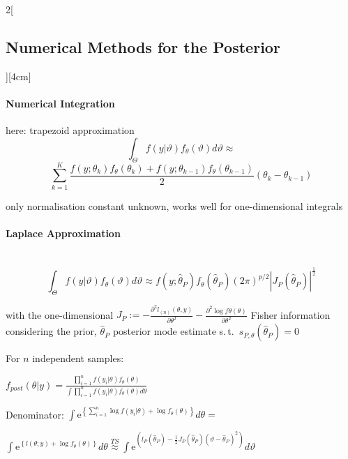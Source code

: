 \documentclass[8pt]{extarticle}
\begin{document}
\begin{multicols}{2}[\subsection{Numerical Methods for the Posterior}][4cm]

\paragraph{Numerical Integration} here: trapezoid approximation
$$\int_\Theta f(y|\vartheta)f_\theta(\vartheta)d\vartheta\approx$$ $$  \sum_{k=1}^K \frac{f(y;\theta_k)f_\theta(\theta_k) + f(y;\theta_{k-1})f_\theta(\theta_{k-1})}{2}(\theta_k {-} \theta_{k-1})$$

 \noindent only normalisation constant unknown, works well for one-dimensional integrals


\paragraph{Laplace Approximation} \ \\

$$\int_\Theta f(y|\vartheta)f_\theta(\vartheta)d\vartheta \approx f(y;\hat{\theta}_P) f_\theta(\hat{\theta}_P)(2\pi)^{p/2}\left|J_{P}(\hat{\theta}_P)\right|^{\frac{1}{2}}$$

\noindent with the one-dimensional $J_{P} := {-}\frac{\partial^2 l_{(n)}(\theta,y)}{\partial \theta^2} {-} \frac{\partial^2 \log f\theta(\theta)}{\partial\theta^2}$ Fisher information considering the prior, $\hat{\theta}_P$ posterior mode estimate s.\,t.\ $s_{P,\theta}(\hat{\theta}_P)=0$

\begin{Proof}
For $n$ independent samples:\vspace{0.2em}

$f_{post}(\theta|y)=\frac{\prod_{i=1}^n f(y_i|\theta)f_\theta(\theta)}{\int \prod_{i=1}^n f(y_i|\theta)f_\theta(\theta)d\theta}$
\vspace{0.6em}

\noindent Denominator:\vspace{0.2em}
\vspace{0.2em}
$\int \mathrm{e}^{\left\{ \sum_{i=1}^n \log f(y_i|\theta) + \log f_\theta(\theta)\right\}} d\theta =$ 

\noindent $ \int \mathrm{e}^{\left\{ l(\theta;y){+}\log f_\theta(\theta) \right\}} d\theta \overset{TS}{\approx} \int \mathrm{e}^{(l_P(\hat{\theta}_P) {-} \frac{1}{2} J_P(\hat{\theta}_P)(\vartheta {-}\hat{\theta}_P)^2)}d\vartheta$
\vspace{0.6em}


\end{Proof}
\end{multicols}
\end{document}
